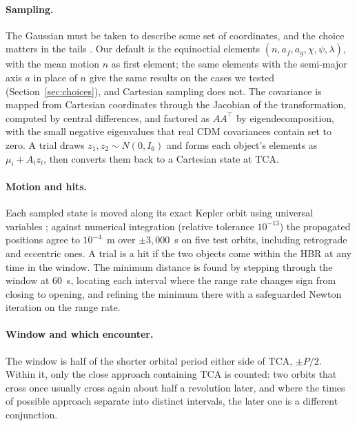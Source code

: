 \documentclass[11pt]{article}
\begin{document}
\paragraph{Sampling.} The Gaussian must be taken to describe some set of coordinates, and the
choice matters in the tails \cite{junkins1996}. Our default is the equinoctial elements
\cite{broucke1972} $(n, a_f, a_g, \chi, \psi, \lambda)$, with the mean motion $n$ as first
element; the same elements with the semi-major axis $a$ in place of $n$ give the same results
on the cases we tested (Section~\ref{sec:choices}), and Cartesian sampling does not. The covariance is mapped from Cartesian coordinates through the Jacobian of the
transformation, computed by central differences, and factored as $A A^\top$ by eigendecomposition,
with the small negative eigenvalues that real CDM covariances contain set to zero. A trial draws
$z_1, z_2 \sim N(0, I_6)$ and forms each object's elements as $\mu_i + A_i z_i$, then converts
them back to a Cartesian state at TCA.

\paragraph{Motion and hits.} Each sampled state is moved along its exact Kepler orbit using
universal variables \cite{vallado2013}; against numerical integration (relative tolerance
$10^{-13}$) the propagated positions agree to $10^{-4}$~m over $\pm3{,}000$~s on five test
orbits, including retrograde and eccentric ones. A trial is a hit if the two objects come within
the HBR at any time in the window. The minimum distance is found by stepping through the
window at 60~s, locating each interval where the range rate changes sign from closing to
opening, and refining the minimum there with a safeguarded Newton iteration on the range rate.

\paragraph{Window and which encounter.} The window is half of the shorter orbital period either
side of TCA, $\pm P/2$. Within it, only the close approach containing TCA is counted: two orbits
that cross once usually cross again about half a revolution later, and where the times of
possible approach separate into distinct intervals, the later one is a different conjunction.
\end{document}
